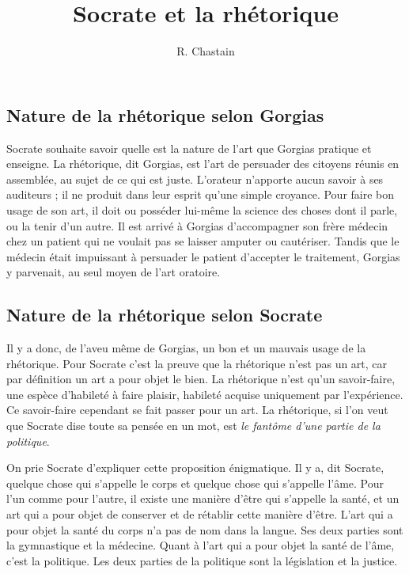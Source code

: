 \documentclass[a5paper,12pt]{article}
\title{Socrate et la rhétorique}
\author{\small R. Chastain}
\begin{document}
\maketitle

\newpage
\subsection*{Nature de la rhétorique selon Gorgias}

Socrate souhaite savoir quelle est la nature de l'art que Gorgias pratique et enseigne. La rhétorique, dit Gorgias, est l'art de persuader des citoyens réunis en assemblée, au sujet de ce qui est juste. L'orateur n'apporte aucun savoir à ses auditeurs ; il ne produit dans leur esprit qu'une simple croyance. Pour faire bon usage de son art, il doit ou posséder lui-même la science des choses dont il parle, ou la tenir d'un autre. Il est arrivé à Gorgias d'accompagner son frère médecin chez un patient qui ne voulait pas se laisser amputer ou cautériser. Tandis que le médecin était impuissant à persuader le patient d'accepter le traitement, Gorgias y parvenait, au seul moyen de l'art oratoire.


\subsection*{Nature de la rhétorique selon Socrate}

Il y a donc, de l'aveu même de Gorgias, un bon et un mauvais usage de la rhétorique. Pour Socrate c'est la preuve que la rhétorique n'est pas un art, car par définition un art a pour objet le bien. La rhétorique n'est qu'un savoir-faire, une espèce d'habileté à faire plaisir, habileté acquise uniquement par l'expérience. Ce savoir-faire cependant se fait passer pour un art. La rhétorique, si l'on veut que Socrate dise toute sa pensée en un mot, est \emph{le fantôme d'une partie de la politique}.

On prie Socrate d'expliquer cette proposition énigmatique. Il y a, dit Socrate, quelque chose qui s'appelle le corps et quelque chose qui s'appelle l'âme. Pour l'un comme pour l'autre, il existe une manière d'être qui s'appelle la santé, et un art qui a pour objet de conserver et de rétablir cette manière d'être. L'art qui a pour objet la santé du corps n'a pas de nom dans la langue. Ses deux parties sont la gymnastique et la médecine. Quant à l'art qui a pour objet la santé de l'âme, c'est la politique. Les deux parties de la politique sont la législation et la justice.
\end{document}
